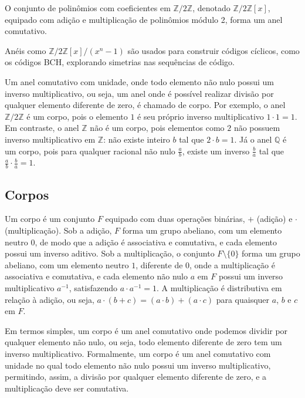 \begin{example}
O conjunto de polinômios com coeficientes em $\mathbb{Z}/2\mathbb{Z}$, denotado
$\mathbb{Z}/2\mathbb{Z}[x]$, equipado com adição e multiplicação de polinômios
módulo 2, forma um anel comutativo.
\end{example}

\begin{example}
Anéis como $\mathbb{Z}/2\mathbb{Z}[x] / (x^n - 1)$
são usados para construir códigos cíclicos, como os códigos BCH, explorando
simetrias nas sequências de código.
\end{example}


Um anel comutativo com unidade, onde todo elemento não nulo possui um inverso
multiplicativo, ou seja, um anel onde é possível realizar divisão por qualquer
elemento diferente de zero, é chamado de corpo.
Por exemplo, o anel $\mathbb{Z}/2\mathbb{Z}$ é um corpo, pois o elemento $1$ é seu próprio
inverso multiplicativo $1 \cdot 1 = 1$. Em contraste, o anel $\mathbb{Z}$ não é
um corpo, pois elementos como $2$ não possuem
inverso multiplicativo em $\mathbb{Z}$: não existe inteiro $b$ tal que $2 \cdot b = 1$.
Já o anel $\mathbb{Q}$ é um corpo, pois para qualquer racional
não nulo $\frac{a}{b}$, existe um inverso $\frac{b}{a}$ tal que
$\frac{a}{b} \cdot \frac{b}{a} = 1$.






\subsection{Corpos}

\begin{definition}[Corpo]
Um corpo é um conjunto $F$ equipado com duas operações binárias, $+$
(adição) e $\cdot$ (multiplicação). Sob a adição, $F$ forma um grupo
abeliano, com um elemento neutro $0$, de modo que a adição é associativa e
comutativa, e cada elemento possui um inverso aditivo. Sob a multiplicação, o
conjunto $F \setminus \{0\}$ forma um grupo abeliano, com um elemento
neutro $1$, diferente de $0$, onde a multiplicação é associativa e
comutativa, e cada elemento não nulo $a$ em $F$ possui um inverso
multiplicativo $a^{-1}$, satisfazendo $a \cdot a^{-1} = 1$. A
multiplicação é distributiva em relação à adição, ou seja,
$a \cdot (b + c) = (a \cdot b) + (a \cdot c)$ para quaisquer $a$, $b$ e $c$ em $F$.
\end{definition}


Em termos simples, um corpo é um anel comutativo onde podemos dividir por
qualquer elemento não nulo, ou seja, todo elemento diferente de zero tem um
inverso multiplicativo. Formalmente, um corpo é um anel comutativo com unidade
no qual todo elemento não nulo possui um inverso multiplicativo, permitindo,
assim, a divisão por qualquer elemento diferente de zero, e a multiplicação
deve ser comutativa.

